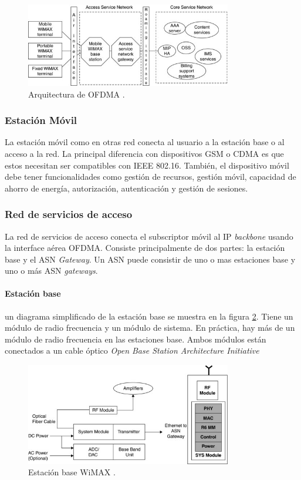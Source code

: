 \documentclass[10pt,journal,compsoc]{IEEEtran}
\begin{document}
\begin{figure}[h]
    \centering
    \includegraphics[width=9cm]{wimax-architecture}
    \caption{Arquitectura de OFDMA \cite{davis}.}
    \label{fig:wimax-architecture}
\end{figure}

\subsubsection{Estación Móvil}
La estación móvil como en otras red conecta al usuario a la estación base o al acceso a la red. La principal diferencia con dispositivos GSM o CDMA es que estos necesitan ser compatibles con IEEE 802.16. También, el dispositivo móvil debe tener funcionalidades como gestión de recursos, gestión móvil, capacidad de ahorro de energía, autorización, autenticación y gestión de sesiones.

\subsubsection{Red de servicios de acceso}
La red de servicios de acceso conecta el subscriptor móvil al IP \emph{backbone} usando la interface aérea OFDMA. Consiste principalmente de dos partes: la estación base y el ASN \emph{Gateway}. Un ASN puede consistir de uno o mas estaciones base y uno o más ASN \emph{gateways}.

\paragraph{Estación base} un diagrama simplificado de la estación base se muestra en la figura \ref{fig:base-station}. Tiene un módulo de radio frecuencia y un módulo de sistema. En práctica, hay más de un módulo de radio frecuencia en las estaciones base. Ambos módulos están conectados a un cable óptico \emph{Open Base Station Architecture Initiative}

\begin{figure}[h]
    \centering
    \includegraphics[width=9cm]{base-station}
    \caption{Estación base WiMAX \cite{davis}.}
    \label{fig:base-station}
\end{figure}
\end{document}
